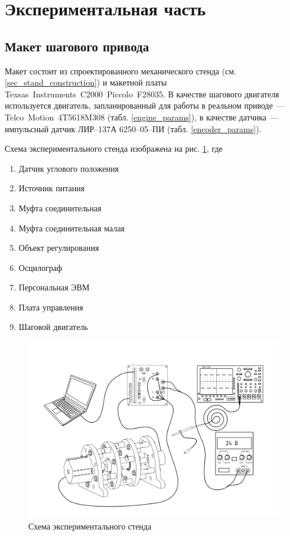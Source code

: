 \newpage
\section{Экспериментальная часть}
\subsection{Макет шагового привода}

Макет состоит из спроектированного механического стенда
(см. \ref{sec_stand_construction}) и макетной платы
Texsas~Instruments~C2000~Piccolo~F28035.
В качестве шагового двигателя используется двигатель, запланированный для работы
в реальном приводе~--- Telco~Motion~4T5618M308 (табл. \ref{engine_params}), в
качестве датчика~--- импульсный датчик ЛИР--137А 6250--05--ПИ
(табл. \ref{encoder_params}).

Схема экспериментального стенда изображена на рис.
\ref{pic_experim_stand_scheme}, где

\begin{enumerate}
        \item Датчик углового положения
        \item Источник питания
        \item Муфта соединительная
        \item Муфта соединительная малая
        \item Объект регулирования
        \item Осцилограф
        \item Персональная ЭВМ
        \item Плата управления
        \item Шаговой двигатель
\end{enumerate}

\begin{figure}[hb]
    \centering
    \centering
    \includegraphics[width=\linewidth, keepaspectratio,
                    clip=true, trim=51mm 21mm 51mm 20mm]
                    {src/pictures/experimental_stand_draft}
    \caption{Схема экспериментального стенда}
    \label{pic_experim_stand_scheme}
\end{figure}
